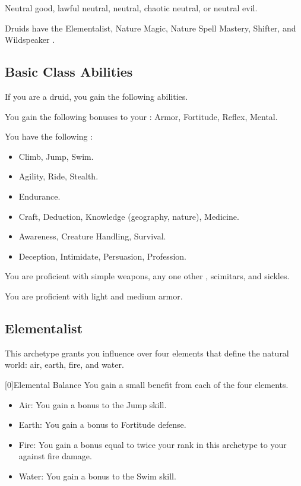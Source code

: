      Neutral good, lawful neutral, neutral, chaotic neutral, or neutral evil.

     Druids have the Elementalist, Nature Magic, Nature Spell Mastery, Shifter, and Wildspeaker .

    \subsection{Basic Class Abilities}
        If you are a druid, you gain the following abilities.

        You gain the following bonuses to your :  Armor,  Fortitude,  Reflex,  Mental.

        You have the following :
        \begin{itemize}
            \item {} Climb, Jump, Swim.
            \item {} Agility, Ride, Stealth.
            \item {} Endurance.
            \item {} Craft, Deduction, Knowledge (geography, nature), Medicine.
            \item {} Awareness, Creature Handling, Survival.
            \item {} Deception, Intimidate, Persuasion, Profession.
        \end{itemize}

        You are proficient with simple weapons, any one other , scimitars, and sickles.

        You are proficient with light and medium armor.

    \newpage
    \subsection{Elementalist}\label{Elementalist}
        This archetype grants you influence over four elements that define the natural world: air, earth, fire, and water.

        [0]{Elemental Balance} You gain a small benefit from each of the four elements.
        \begin{itemize}
            \item Air: You gain a  bonus to the Jump skill.
            \item Earth: You gain a  bonus to Fortitude defense.
            \item Fire: You gain a bonus equal to twice your rank in this archetype to your  against fire damage.
            \item Water: You gain a  bonus to the Swim skill.
        \end{itemize}

